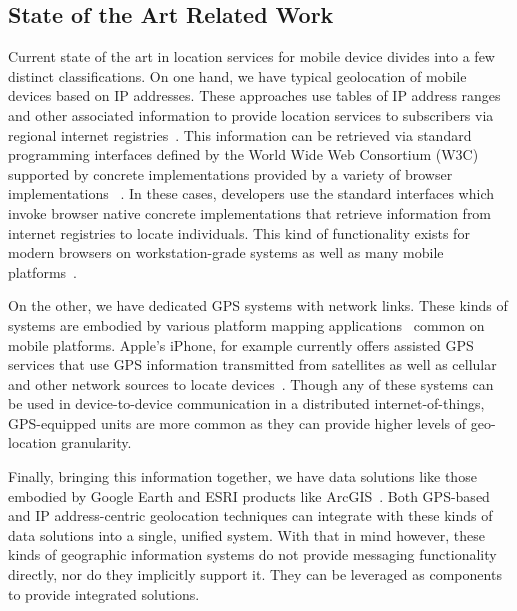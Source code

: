 \documentclass{sbir}
\begin{document}
\subsection{State of the Art Related Work}
Current state of the art in location services for mobile device divides into a few distinct classifications.  On one hand, we have typical geolocation of mobile devices based on IP addresses.  These approaches use tables of IP address ranges and other associated information to provide location services to subscribers via regional internet registries~\cite{AIRN:13,RIPE:13}.  This information can be retrieved via standard programming interfaces defined by the World Wide Web Consortium (W3C)~\cite{w3c:13} supported by concrete implementations provided by a variety of browser implementations ~\cite{firefox:13,Pi:13}.  In these cases, developers use the standard interfaces which invoke browser native concrete implementations that retrieve information from internet registries to locate individuals.  This kind of functionality exists for modern browsers on workstation-grade systems as well as many mobile platforms~\cite{safari:13,opera:13}.

On the other, we have dedicated GPS systems with network links.  These kinds of systems are embodied by various platform mapping applications~\cite{gmap:13,amap:13} common on mobile platforms.  Apple's iPhone, for example currently offers assisted GPS services that use GPS information transmitted from satellites as well as cellular and other network sources to locate devices~\cite{amap:13}.  Though any of these systems can be used in device-to-device communication in a distributed internet-of-things, GPS-equipped units are more common as they can provide higher levels of geo-location granularity.

Finally, bringing this information together, we have data solutions like those embodied by Google Earth and ESRI products like ArcGIS~\cite{esri:13,gearth:13}.  Both GPS-based and IP address-centric geolocation techniques can integrate with these kinds of data solutions into a single, unified system.  With that in mind however, these kinds of geographic information systems do not provide messaging functionality directly, nor do they implicitly support it.  They can be leveraged as components to provide integrated solutions.
\end{document}
